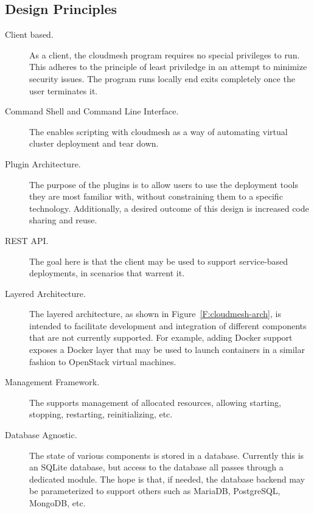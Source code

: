 \documentclass[9pt,twocolumn,twoside]{styles/osajnl}
\begin{document}
\subsection{Design Principles}

\begin{description}

\item[Client based.] As a client, the cloudmesh program requires no
  special privileges to run. This adheres to the principle of least
  priviledge in an attempt to minimize security issues. The program
  runs locally end exits completely once the user terminates it.


\item[Command Shell and Command Line Interface.] The enables scripting
  with cloudmesh as a way of automating virtual cluster deployment and
  tear down.


\item[Plugin Architecture.] The purpose of the plugins is to allow
  users to use the deployment tools they are most familiar with,
  without constraining them to a specific technology. Additionally, a
  desired outcome of this design is increased code sharing and reuse.


\item[REST API.] The goal here is that the client may be used to
  support service-based deployments, in scenarios that warrent it.


\item[Layered Architecture.] The layered architecture, as shown in
  Figure~\ref{F:cloudmesh-arch}, is intended to facilitate development
  and integration of different components that are not currently
  supported. For example, adding Docker support exposes a Docker layer
  that may be used to launch containers in a similar fashion to
  OpenStack virtual machines.


\item[Management Framework.] The supports management of allocated
  resources, allowing starting, stopping, restarting, reinitializing,
  etc.


\item[Database Agnostic.] The state of various components is stored in
  a database. Currently this is an SQLite database, but access to the
  database all passes through a dedicated module. The hope is that, if
  needed, the database backend may be parameterized to support others
  such as MariaDB, PostgreSQL, MongoDB, etc.

\end{description}
\end{document}
